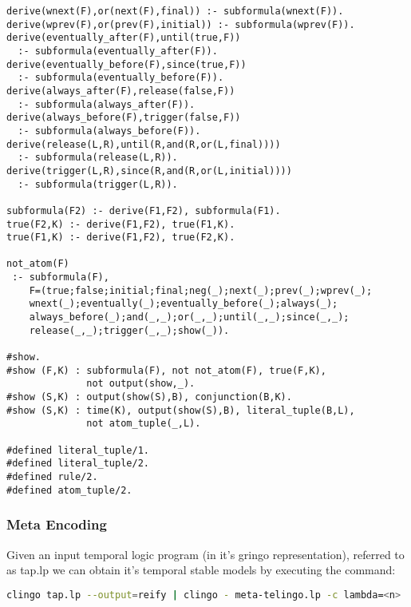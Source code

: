 \begin{center}
\begin{minipage}{\linewidth}
  \begin{lstlisting}[language=clingo, label={lst:meta-telingo2}]
derive(wnext(F),or(next(F),final)) :- subformula(wnext(F)).
derive(wprev(F),or(prev(F),initial)) :- subformula(wprev(F)).
derive(eventually_after(F),until(true,F)) 
  :- subformula(eventually_after(F)).
derive(eventually_before(F),since(true,F)) 
  :- subformula(eventually_before(F)).
derive(always_after(F),release(false,F)) 
  :- subformula(always_after(F)).
derive(always_before(F),trigger(false,F)) 
  :- subformula(always_before(F)).
derive(release(L,R),until(R,and(R,or(L,final)))) 
  :- subformula(release(L,R)).
derive(trigger(L,R),since(R,and(R,or(L,initial)))) 
  :- subformula(trigger(L,R)).

subformula(F2) :- derive(F1,F2), subformula(F1).
true(F2,K) :- derive(F1,F2), true(F1,K).
true(F1,K) :- derive(F1,F2), true(F2,K).

not_atom(F) 
 :- subformula(F), 
    F=(true;false;initial;final;neg(_);next(_);prev(_);wprev(_);
    wnext(_);eventually(_);eventually_before(_);always(_);
    always_before(_);and(_,_);or(_,_);until(_,_);since(_,_);
    release(_,_);trigger(_,_);show(_)).

#show.
#show (F,K) : subformula(F), not not_atom(F), true(F,K), 
              not output(show,_).
#show (S,K) : output(show(S),B), conjunction(B,K).
#show (S,K) : time(K), output(show(S),B), literal_tuple(B,L), 
              not atom_tuple(_,L).

#defined literal_tuple/1.
#defined literal_tuple/2.
#defined rule/2.
#defined atom_tuple/2.
\end{lstlisting}
\end{minipage}
\end{center}

\subsubsection{Meta Encoding}

Given an input temporal logic program (in it's gringo representation),
referred to as tap.lp we can obtain it's temporal stable models by
executing the command:

\begin{lstlisting}[language=bash,numbers=none]
clingo tap.lp --output=reify | clingo - meta-telingo.lp -c lambda=<n>
\end{lstlisting}

